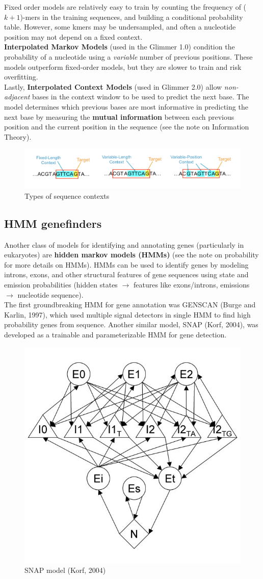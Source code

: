 \documentclass[12pt]{article}
\begin{document}
Fixed order models are relatively easy to train by counting the frequency of ($k+1$)-mers in the training sequences, and building a conditional probability table. However, some kmers may be undersampled, and often a nucleotide position may not depend on a fixed context.\\[10pt]
\textbf{Interpolated Markov Models} (used in the Glimmer 1.0) condition the probability of a nucleotide using a \textit{variable} number of previous positions. These models outperform fixed-order models, but they are slower to train and risk overfitting.\\[10pt]
Lastly, \textbf{Interpolated Context Models} (used in Glimmer 2.0) allow \textit{non-adjacent} bases in the context window to be used to predict the next base. The model determines which previous bases are most informative in predicting the next base by measuring the \textbf{mutual information} between each previous position and the current position in the sequence (see the note on Information Theory).

\begin{figure}[h]
    \centering
    \includegraphics[width=\linewidth]{hmm_context.png}
    \caption{Types of sequence contexts}
    \label{fig:my_label}
\end{figure}

\subsection{HMM genefinders}
Another class of models for identifying and annotating genes (particularly in eukaryotes) are \textbf{hidden markov models (HMMs)} (see the note on probability for more details on HMMs). HMMs can be used to identify genes by modeling introns, exons, and other structural features of gene sequences using state and emission probabilities (hidden states $\rightarrow$ features like exons/introns, emissions $\rightarrow$ nucleotide sequence).\\[10pt]
The first groundbreaking HMM for gene annotation was GENSCAN (Burge and Karlin, 1997), which used multiple signal detectors in single HMM to find high probability genes from sequence. Another similar model, SNAP (Korf, 2004), was developed as a trainable and parameterizable HMM for gene detection.
\begin{figure}[h]
    \centering
    \includegraphics[width=.4\linewidth]{snap.jpg}
    \caption{SNAP model (Korf, 2004)}
    \label{fig:snap}
\end{figure}
\end{document}
